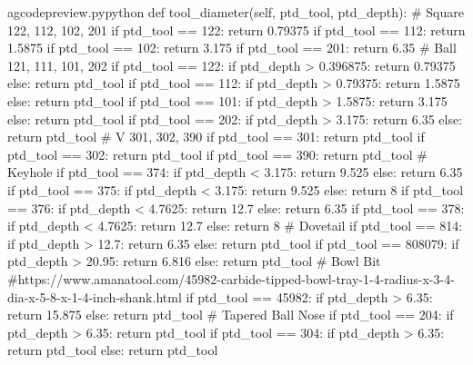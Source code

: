 \documentclass{ltxdoc}
\begin{document}
\lstset{firstnumber=\thegcpy}
\begin{writecode}{a}{gcodepreview.py}{python}
    def tool_diameter(self, ptd_tool, ptd_depth):
# Square 122, 112, 102, 201
        if ptd_tool == 122:
            return 0.79375
        if ptd_tool == 112:
            return 1.5875
        if ptd_tool == 102:
            return 3.175
        if ptd_tool == 201:
            return 6.35
# Ball 121, 111, 101, 202
        if ptd_tool == 122:
            if ptd_depth > 0.396875:
                return 0.79375
            else:
                return ptd_tool
        if ptd_tool == 112:
            if ptd_depth > 0.79375:
                return 1.5875
            else:
                return ptd_tool
        if ptd_tool == 101:
            if ptd_depth > 1.5875:
                return 3.175
            else:
                return ptd_tool
        if ptd_tool == 202:
            if ptd_depth > 3.175:
                return 6.35
            else:
                return ptd_tool
# V 301, 302, 390
        if ptd_tool == 301:
            return ptd_tool
        if ptd_tool == 302:
            return ptd_tool
        if ptd_tool == 390:
            return ptd_tool
# Keyhole
        if ptd_tool == 374:
            if ptd_depth < 3.175:
                return 9.525
            else:
                return 6.35
        if ptd_tool == 375:
            if ptd_depth < 3.175:
                return 9.525
            else:
                return 8
        if ptd_tool == 376:
            if ptd_depth < 4.7625:
                return 12.7
            else:
                return 6.35
        if ptd_tool == 378:
            if ptd_depth < 4.7625:
                return 12.7
            else:
                return 8
# Dovetail
        if ptd_tool == 814:
            if ptd_depth > 12.7:
                return 6.35
            else:
                return ptd_tool
        if ptd_tool == 808079:
            if ptd_depth > 20.95:
                return 6.816
            else:
                return ptd_tool
# Bowl Bit
#https://www.amanatool.com/45982-carbide-tipped-bowl-tray-1-4-radius-x-3-4-dia-x-5-8-x-1-4-inch-shank.html 
        if ptd_tool == 45982:
            if ptd_depth > 6.35:
                return 15.875
            else:
                return ptd_tool
# Tapered Ball Nose
        if ptd_tool == 204:
            if ptd_depth > 6.35:
                return ptd_tool
        if ptd_tool == 304:
            if ptd_depth > 6.35:
                return ptd_tool
            else:
                return ptd_tool

\end{writecode}
\addtocounter{gcpy}{87}
\end{document}
